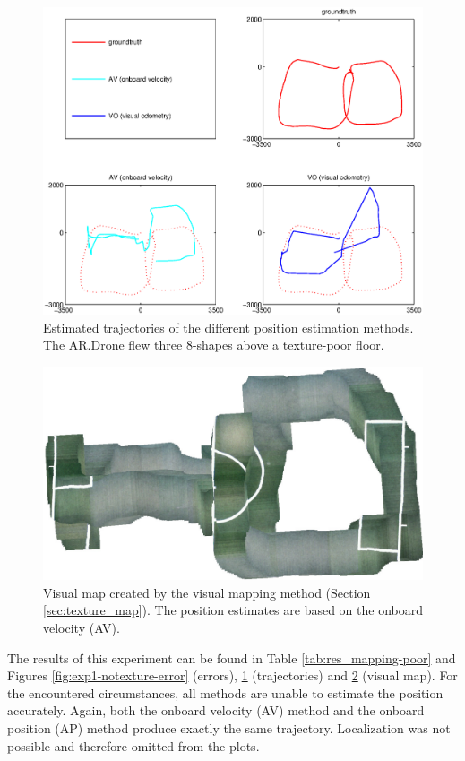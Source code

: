 \begin{figure}[htb!]
\centering
\includegraphics[width=\linewidth,trim=2cm 1.5cm 2cm 1cm]{images/exp1-run2-path.eps}
\caption{Estimated trajectories of the different position estimation methods. The AR.Drone flew three 8-shapes above a texture-poor floor.}
\label{fig:exp1-notexture-path}
\end{figure}

\begin{figure}[htb!]
\centering
\includegraphics[width=0.75\linewidth]{images/exp1-run2-map.jpg}
\caption{Visual map created by the visual mapping method (Section \ref{sec:texture_map}). The position estimates are based on the onboard velocity (AV).}
\label{fig:exp1-notexture-map}
\end{figure}


The results of this experiment can be found in Table \ref{tab:res_mapping-poor} and Figures \ref{fig:exp1-notexture-error} (errors), \ref{fig:exp1-notexture-path} (trajectories) and \ref{fig:exp1-notexture-map} (visual map).
For the encountered circumstances, all methods are unable to estimate the position accurately.
Again, both the onboard velocity (AV) method and the onboard position (AP) method produce exactly the same trajectory.
Localization was not possible and therefore omitted from the plots.

